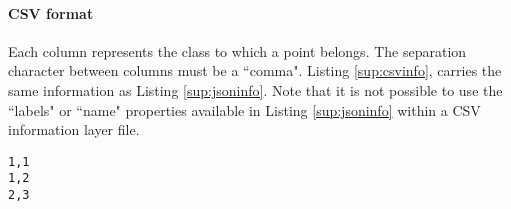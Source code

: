 		\paragraph{CSV format}
Each column represents the class to which a point belongs. The separation character between columns must be a ``comma". Listing \ref{sup:csvinfo}, carries the same information as Listing \ref{sup:jsoninfo}. Note that it is not possible to use the ``labels" or ``name" properties available in Listing \ref{sup:jsoninfo} within a CSV information layer file. 


\begin{lstlisting}[float,caption=CSV information layer file,label=sup:csvinfo]
1,1
1,2
2,3
\end{lstlisting}
